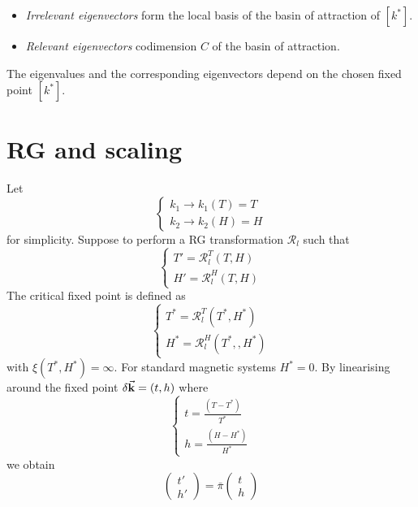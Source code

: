 \documentclass[../main/main.tex]{subfiles}
\begin{document}
\begin{itemize}
\item \emph{Irrelevant eigenvectors} form the local basis of the basin of attraction of \( [k^*] \).
\item \emph{Relevant eigenvectors} codimension \( C \) of the basin of attraction.
\end{itemize}
\begin{remark}
The eigenvalues and the corresponding eigenvectors depend on the chosen fixed point \( [k^*] \).
\end{remark}

\section{RG and scaling}
Let
\begin{equation}
  \begin{cases}
   k_1 \rightarrow k_1 (T) = T\\
   k_2 \rightarrow k_2 (H) = H
  \end{cases}
\end{equation}
for simplicity. Suppose to perform a RG transformation \( \mathcal{R}_l \) such that
\begin{equation}
  \begin{cases}
   T' = \mathcal{R}_l ^T (T,H) \\
   H' = \mathcal{R}_l ^H (T,H)
  \end{cases}
\end{equation}
The critical fixed point is defined as
\begin{equation}
  \begin{cases}
   T^* = \mathcal{R}_l ^T (T^*,H^*)\\
   H^* = \mathcal{R}_l ^H (T^*,,H^*)
  \end{cases}
\end{equation}
with \( \xi (T^*,H^*) = \infty  \).
For standard magnetic systems \( H^*=0 \). By linearising around the fixed point
\( \delta \va{k}= (t,h) \)  where
\begin{equation}
  \begin{cases}
   t = \frac{(T-T^*)}{T^*}\\
   h = \frac{(H-H^*)}{H^*}
  \end{cases}
\end{equation}
we obtain
\begin{equation}
  \begin{pmatrix}
  t' \\
  h'
  \end{pmatrix}
  = \bar{\pi }
  \begin{pmatrix}
  t \\
  h
  \end{pmatrix}
\end{equation}
\end{document}
